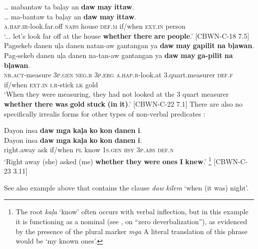 \ea
… mabantaw  ta  baļay  an  \textbf{daw}  \textbf{may}  \textbf{ittaw}. \smallskip\\
\gll … ma-bantaw  ta  baļay  an  \textbf{daw}  \textbf{may}  \textbf{ittaw}. \\
{} \textsc{a.hap.ir}-look.far.off  \textsc{nabs}  house  \textsc{def.m}  if/when  \textsc{ext.in}  person \\
\glt ‘... let’s look far off at the house \textbf{whether} \textbf{there} \textbf{are} \textbf{people}.’ [CBWN-C-18 7.5]
\z
\ea
\label{bkm:Ref115098919}
Pagsekeb  danen  uļa  danen  natan-aw  gantangan  ya \textbf{daw}  \textbf{may}  \textbf{gapilit}  \textbf{na}  \textbf{bļawan}. \smallskip\\
\gll Pag-sekeb  danen  uļa  danen  na-tan-aw  gantangan  ya \textbf{daw}  \textbf{may}  \textbf{ga-pilit}  \textbf{na}  \textbf{bļawan}. \\
\textsc{nr.act}-measure  3\textsc{p.gen}  \textsc{neg.r}  3\textsc{p.erg}  \textsc{a.hap.r}-look.at  3.quart.measurer  \textsc{def.f}
if/when  \textsc{ext.in}  \textsc{i.r}-stick  \textsc{lk}  gold \\
\glt `When they were measuring, they had not looked at the 3 quart measurer \textbf{whether} \textbf{there} \textbf{was} \textbf{gold} \textbf{stuck} \textbf{(in} \textbf{it)}.’ [CBWN-C-22 7.1]
\z
There are also no specifically irrealis forms for other types of non-verbal predicates :

\ea
\label{bkm:Ref115095578}
Dayon  insa  \textbf{daw}  \textbf{mga}  \textbf{kaļa}  \textbf{ko}  \textbf{kon}  \textbf{danen}  \textbf{i}. \smallskip\\
\gll Dayon  insa  \textbf{daw}  \textbf{mga}  \textbf{kaļa}  \textbf{ko}  \textbf{kon}  \textbf{danen}  \textbf{i}. \\
right.away  ask  if/when  \textsc{pl}  know  1\textsc{s.gen}  \textsc{hsy}  3\textsc{p.abs}  \textsc{def.n} \\
\glt ‘Right away (she) asked (me) \textbf{whether} \textbf{they} \textbf{were} \textbf{ones} \textbf{I} \textbf{knew}.’
\footnote{The root \textit{kaļa} ‘know’ often occurs with verbal inflection, but in this example it is functioning as a nominal (see ,  on “zero deverbalization”), as evidenced by the presence of the plural marker \textit{mga} A literal translation of this phrase would be ‘my known ones’.} [CBWN-C-23 3.11]
\z

See also example  above that contains the clause \textit{daw kilem} ‘when (it was) night’.


